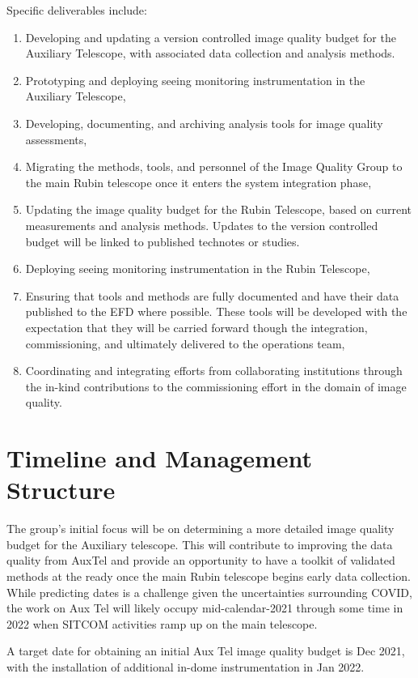 \documentclass[SE,authoryear,toc]{lsstdoc}
\begin{document}
Specific deliverables include:
\begin{enumerate}
\item Developing and updating a version controlled image quality budget for the Auxiliary Telescope, with associated data collection and analysis methods.
\item Prototyping and deploying seeing monitoring instrumentation in the Auxiliary Telescope,
\item Developing, documenting, and archiving analysis tools for image quality assessments,
\item Migrating the methods, tools, and personnel of the Image Quality Group to the main Rubin telescope once it enters the system integration phase,
\item Updating the image quality budget for the Rubin Telescope, based on current measurements and analysis methods.
    Updates to the version controlled budget will be linked to published technotes or studies.
\item Deploying seeing monitoring instrumentation in the Rubin Telescope,
\item Ensuring that tools and methods are fully documented and have their data published to the EFD where possible.
    These tools will be developed with the expectation that they will be carried forward though the integration, commissioning, and ultimately delivered to the operations team,
\item Coordinating and integrating efforts from collaborating institutions through the in-kind contributions to the commissioning effort in the domain of image quality.
\end{enumerate}

\section{Timeline and Management Structure}

The group's initial focus will be on determining a more detailed image quality budget for the Auxiliary telescope.
This will contribute to improving the data quality from AuxTel and provide an opportunity to have a toolkit of validated methods at the ready once the main Rubin telescope begins early data collection.
While predicting dates is a challenge given the uncertainties surrounding COVID, the work on Aux Tel will likely occupy mid-calendar-2021 through some time in 2022 when SITCOM activities ramp up on the main telescope.

A target date for obtaining an initial Aux Tel image quality budget is Dec 2021, with the installation of additional in-dome instrumentation in Jan 2022.
\end{document}
